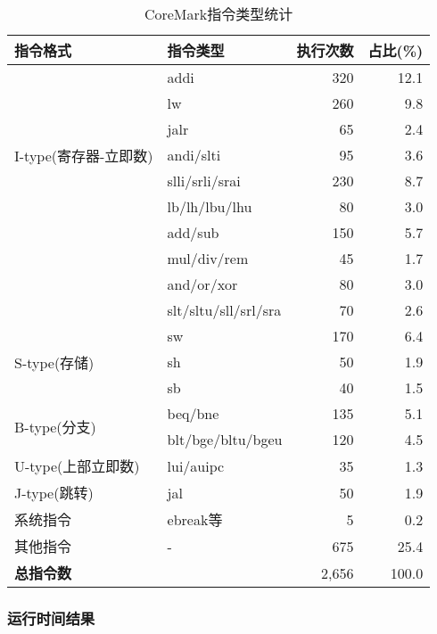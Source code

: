 \documentclass[bachelor]{thesis-uestc}
\begin{document}
\begin{table}[htbp]
    \caption{CoreMark指令类型统计}
    \centering
    \begin{tabular}{|l|l|r|r|}
    \hline
    \textbf{指令格式} & \textbf{指令类型} & \textbf{执行次数} & \textbf{占比(\%)} \\
    \hline
    \multirow{7}{*}{I-type(寄存器-立即数)} 
     & addi & 320 & 12.1 \\
    \cline{2-4}
     & lw & 260 & 9.8 \\
    \cline{2-4}
     & jalr & 65 & 2.4 \\
    \cline{2-4}
     & andi/slti & 95 & 3.6 \\
    \cline{2-4}
     & slli/srli/srai & 230 & 8.7 \\
    \cline{2-4}
     & lb/lh/lbu/lhu & 80 & 3.0 \\
    \hline
    \multirow{4}{*}{R-type(寄存器-寄存器)} 
     & add/sub & 150 & 5.7 \\
    \cline{2-4}
     & mul/div/rem & 45 & 1.7 \\
    \cline{2-4}
     & and/or/xor & 80 & 3.0 \\
    \cline{2-4}
     & slt/sltu/sll/srl/sra & 70 & 2.6 \\
    \hline
    \multirow{3}{*}{S-type(存储)} 
     & sw & 170 & 6.4 \\
    \cline{2-4}
     & sh & 50 & 1.9 \\
    \cline{2-4}
     & sb & 40 & 1.5 \\
    \hline
    \multirow{2}{*}{B-type(分支)} 
     & beq/bne & 135 & 5.1 \\
    \cline{2-4}
     & blt/bge/bltu/bgeu & 120 & 4.5 \\
    \hline
    U-type(上部立即数) & lui/auipc & 35 & 1.3 \\
    \hline
    J-type(跳转) & jal & 50 & 1.9 \\
    \hline
    系统指令 & ebreak等 & 5 & 0.2 \\
    \hline
    其他指令 & - & 675 & 25.4 \\
    \hline
    \textbf{总指令数} & & 2,656 & 100.0 \\
    \hline
    \end{tabular}
    \label{tab:instruction_stats}
    \end{table}

    \subsubsection{运行时间结果}
\end{document}

